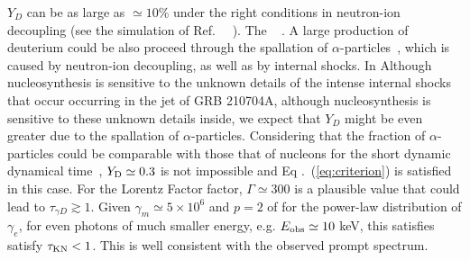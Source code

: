 \documentclass[prd,twocolumn,amsmath,amssymb,aps,linenumbers]{revtex4-2} %
\providecommand{\DIFaddtex}[1]{{\protect\color{blue} \sf #1}} %
\providecommand{\DIFdeltex}[1]{{\protect\color{red} \scriptsize #1}} %
\providecommand{\DIFaddbegin}{} %
\providecommand{\DIFaddend}{} %
\providecommand{\DIFdelbegin}{} %
\providecommand{\DIFdelend}{} %
\providecommand{\DIFadd}[1]{\texorpdfstring{\DIFaddtex{#1}}{#1}} %
\providecommand{\DIFdel}[1]{\texorpdfstring{\DIFdeltex{#1}}{}} %
\newcommand{\DIFscaledelfig}{0.5}
\newlength{\DIFdelgraphicswidth} %
\newlength{\DIFdelgraphicsheight} %
\newcommand{\DIFaddincludegraphics}[2][]{{\color{blue}\fbox{\DIFOincludegraphics[#1]{#2}}}} %
\newcommand{\DIFdelincludegraphics}[2][]{%
\sbox{\DIFdelgraphicsbox}{\DIFOincludegraphics[#1]{#2}}%
\settoboxwidth{\DIFdelgraphicswidth}{\DIFdelgraphicsbox} %
\settoboxtotalheight{\DIFdelgraphicsheight}{\DIFdelgraphicsbox} %
\scalebox{\DIFscaledelfig}{%
\parbox[b]{\DIFdelgraphicswidth}{\usebox{\DIFdelgraphicsbox}\\[-\baselineskip] \rule{\DIFdelgraphicswidth}{0em}}\llap{\resizebox{\DIFdelgraphicswidth}{\DIFdelgraphicsheight}{%
\setlength{\unitlength}{\DIFdelgraphicswidth}%
\begin{picture}(1,1)%
\thicklines\linethickness{2pt} %
{\color[rgb]{1,0,0}\put(0,0){\framebox(1,1){}}}%
{\color[rgb]{1,0,0}\put(0,0){\line( 1,1){1}}}%
{\color[rgb]{1,0,0}\put(0,1){\line(1,-1){1}}}%
\end{picture}%
}\hspace*{3pt}}} %
} %
\DeclareRobustCommand{\DIFaddbegin}{\DIFOaddbegin \let\includegraphics\DIFaddincludegraphics} %
\DeclareRobustCommand{\DIFaddend}{\DIFOaddend \let\includegraphics\DIFOincludegraphics} %
\DeclareRobustCommand{\DIFdelbegin}{\DIFOdelbegin \let\includegraphics\DIFdelincludegraphics} %
\DeclareRobustCommand{\DIFdelend}{\DIFOaddend \let\includegraphics\DIFOincludegraphics} %
\begin{document}
$Y_{D}$ can be as large as $\simeq10\%$ under the right conditions in neutron-ion decoupling \DIFdelbegin \DIFdel{(see the simulation of Ref.~\mbox{%
\citep[][]{2002ApJ...580..368P}}\hskip0pt%
). The }\DIFdelend \DIFaddbegin \DIFadd{\mbox{%
\citep[see the simulation in][]{2002ApJ...580..368P}}\hskip0pt%
. A }\DIFaddend large production of deuterium could \DIFdelbegin \DIFdel{be }\DIFdelend \DIFaddbegin \DIFadd{also proceed }\DIFaddend through the spallation
of $\alpha$-particles~\citep{2003ApJ...588..931B}, which is caused by neutron-ion decoupling, as well as \DIFaddbegin \DIFadd{by }\DIFaddend internal shocks.
\DIFdelbegin \DIFdel{In }\DIFdelend \DIFaddbegin \DIFadd{Although nucleosynthesis is sensitive to the unknown details of }\DIFaddend the intense internal shocks \DIFdelbegin \DIFdel{that occur }\DIFdelend \DIFaddbegin \DIFadd{occurring }\DIFaddend in the jet of GRB 210704A, \DIFdelbegin \DIFdel{although nucleosynthesis is sensitive to
these unknown details inside, }\DIFdelend we expect that $Y_{D}$ might be even greater due to the spallation of $\alpha$-particles. Considering that the fraction of $\alpha$-particles could be comparable with \DIFdelbegin \DIFdel{those }\DIFdelend \DIFaddbegin \DIFadd{that }\DIFaddend of nucleons for the short \DIFdelbegin \DIFdel{dynamic }\DIFdelend \DIFaddbegin \DIFadd{dynamical }\DIFaddend time~\citep[]{2002ApJ...580..368P,2003ApJ...588..931B}, $Y_{\rm D}\simeq0.3$ is not impossible and Eq\DIFaddbegin \DIFadd{.~}\DIFaddend (\ref{eq:criterion}) is satisfied in this case. For the Lorentz \DIFdelbegin \DIFdel{Factor}\DIFdelend \DIFaddbegin \DIFadd{factor}\DIFaddend , $\Gamma\simeq 300$ is a plausible value that could lead to $\tau_{\gamma D}\gtrsim1$.
Given $\gamma_m\simeq5\times10^{6}$ and $p=2$ \DIFdelbegin \DIFdel{of }\DIFdelend \DIFaddbegin \DIFadd{for }\DIFaddend the power-law distribution of $\gamma_e$, \DIFdelbegin \DIFdel{for }\DIFdelend \DIFaddbegin \DIFadd{even }\DIFaddend photons of much smaller energy, e.g. $E_{\rm obs}\simeq10$ keV, \DIFdelbegin \DIFdel{this satisfies }\DIFdelend \DIFaddbegin \DIFadd{satisfy }\DIFaddend $\tau_{\rm KN}<1$. This is well consistent with the observed prompt spectrum.
\end{document}
